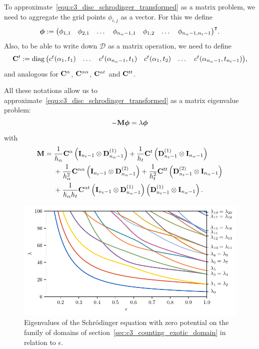 To approximate~\eqref{equ:c3_disc_schrodinger_transformed} as a matrix problem, we need to aggregate the grid points $\phi_{i,j}$ as a vector. For this we define
$$
  \vb*{\phi} := {\begin{pmatrix}
      \phi_{1,1} & \phi_{2,1} & \dots & \phi_{n_\alpha-1, 1} & \phi_{1,2} & \dots & \phi_{n_\alpha-1, n_t-1}
    \end{pmatrix}}^\intercal\text{.}
$$
Also, to be able to write down $\mathcal{D}$ as a matrix operation, we need to define
$$
  \vb{C}^{t} := \operatorname{diag}{\begin{pmatrix}
      c^{t}(\alpha_1, t_1) & \dots & c^{t}(\alpha_{n_\alpha-1}, t_1) & c^{t}(\alpha_1, t_2) & \dots & c^{t}(\alpha_{n_\alpha-1}, t_{n_t-1})
    \end{pmatrix}}\text{,}
$$
and analogous for $\vb{C}^{\alpha}$, $\vb{C}^{\alpha\alpha}$, $\vb{C}^{\alpha t}$ and $\vb{C}^{t t}$.

All these notations allow us to approximate~\eqref{equ:c3_disc_schrodinger_transformed} as a matrix eigenvalue problem:
$$
  -\vb{M} \vb*{\phi} = \lambda \vb*{\phi}
$$
with
\begin{align*}
  \vb{M} = {} & \frac{1}{h_\alpha} \vb{C}^{\alpha} \left(\vb{I}_{n_t - 1}\otimes \vb{D}^{(1)}_{n_\alpha - 1} \right) + \frac{1}{h_t} \vb{C}^{t} \left(\vb{D}^{(1)}_{n_t - 1}  \otimes \vb{I}_{n_\alpha - 1}\right)                \\
              & {} + \frac{1}{h_\alpha^2} \vb{C}^{\alpha\alpha} \left(\vb{I}_{n_t - 1}\otimes \vb{D}^{(2)}_{n_\alpha - 1}\right) + \frac{1}{h_t^2} \vb{C}^{tt} \left(\vb{D}^{(2)}_{n_t - 1}  \otimes \vb{I}_{n_\alpha - 1}\right) \\
              & {} + \frac{1}{h_\alpha h_t} \vb{C}^{\alpha t} \left(\vb{I}_{n_t - 1}\otimes \vb{D}^{(1)}_{n_\alpha - 1} \right) \left( \vb{D}^{(1)}_{n_t - 1}  \otimes \vb{I}_{n_\alpha - 1} \right)\text{.}
\end{align*}

\begin{figure}
  \begin{center}
    \includegraphics[width=\textwidth]{img/chapter3/on_disc/eigenvalues_flow.pdf}
    \caption{Eigenvalues of the Schrödinger equation with zero potential on the family of domains of section~\ref{sec:c3_counting_exotic_domain} in relation to $\epsilon$.}
    \label{fig:c3_disc_eigenvalues_flow}
  \end{center}
\end{figure}

